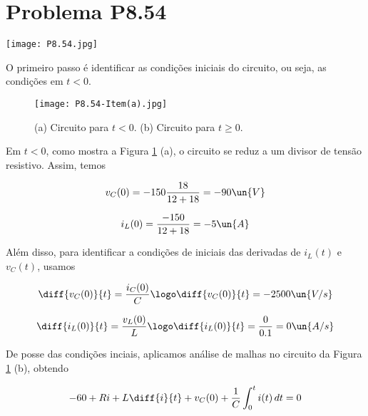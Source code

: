 
\section*{Problema P8.54}

\renewcommand*\thesection{8.54}

\begin{center}
    \texttt{[image: P8.54.jpg]}
\end{center}

O primeiro passo é identificar as condições iniciais do circuito, ou seja, as condições em $t<0$. 

\begin{figure}[hb]
    \centering
    \caption{(a) Circuito para $t<0$. (b) Circuito para $t \geq 0$.}
      \centering
      \texttt{[image: P8.54-Item(a).jpg]} \\
    \label{fig:8.54.1}
\end{figure}

Em $t<0$, como mostra a Figura \ref*{fig:8.54.1} (a), o circuito se reduz a um divisor de tensão resistivo. Assim, temos  

\begin{equation}\label{eq:8.54.1}
    v_C(0) = -150\frac{18}{12 + 18} = - 90 \un{V}
\end{equation}

\begin{equation}\label{eq:8.54.2}
    i_L(0) = \frac{-150}{12 + 18} = - 5 \un{A}
\end{equation}

Além disso, para identificar a condições de iniciais das derivadas de $i_L(t)$ e $v_C(t)$, usamos  

\begin{equation}\label{eq:8.54.3}
    \diff{v_C(0)}{t} = \frac{i_C(0)}{C} \logo \diff{v_C(0)}{t} = -2500 \un{V/s}
\end{equation}

\begin{equation}\label{eq:8.54.4}
    \diff{i_L(0)}{t} = \frac{v_L(0)}{L} \logo \diff{i_L(0)}{t} = \frac{0}{0.1} = 0 \un{A/s}
\end{equation}

De posse das condições inciais, aplicamos análise de malhas no circuito da Figura \ref*{fig:8.54.1} (b), obtendo

\[ -60 + Ri + L\diff{i}{t} + v_C(0) + \frac{1}{C} \int_{0}^{t}i(t) \, dt = 0 \]

